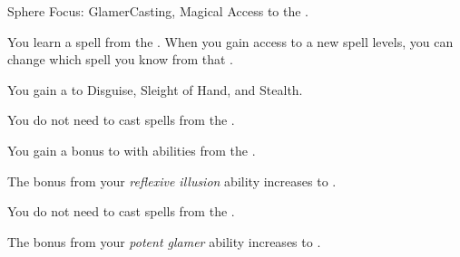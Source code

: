     \begin{feat}{Sphere Focus: Glamer}{Casting, Magical}
        \featpre Access to the  .

         You learn a spell from the  .
        When you gain access to a new spell levels, you can change which spell you know from that .

         You gain a   to Disguise, Sleight of Hand, and Stealth.

         You do not need  to cast spells from the  .

         You gain a  bonus to  with abilities from the  .

         The bonus from your \textit{reflexive illusion} ability increases to .

         You do not need  to cast spells from the  .

         The bonus from your \textit{potent glamer} ability increases to .
    \end{feat}

